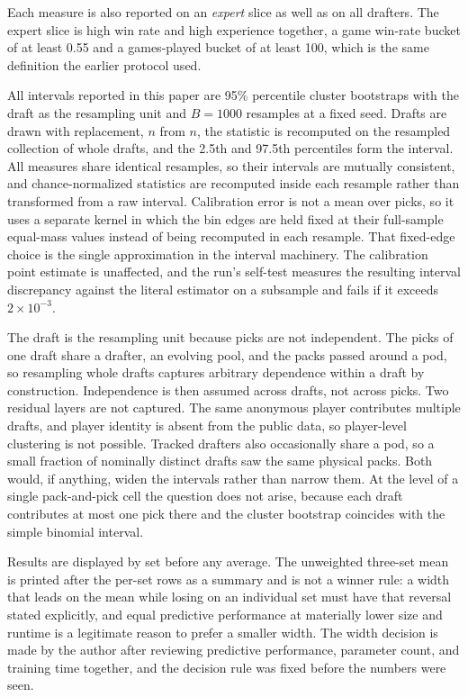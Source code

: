 \documentclass[11pt]{article}
\numberwithin{equation}{section}
\begin{document}
Each measure is also reported on an \emph{expert} slice as well as on all
drafters. The expert slice is high win rate and high experience together, a
game win-rate bucket of at least 0.55 and a games-played bucket of at least 100,
which is the same definition the earlier protocol used.

All intervals reported in this paper are 95\% percentile cluster bootstraps with
the draft as the resampling unit and $B=1000$ resamples at a fixed seed. Drafts
are drawn with replacement, $n$ from $n$, the statistic is recomputed on the
resampled collection of whole drafts, and the 2.5th and 97.5th percentiles form
the interval. All measures share identical resamples, so their intervals are
mutually consistent, and chance-normalized statistics are recomputed inside each
resample rather than transformed from a raw interval. Calibration error is not a
mean over picks, so it uses a separate kernel in which the bin edges are held
fixed at their full-sample equal-mass values instead of being recomputed in each
resample. That fixed-edge choice is the single approximation in the interval
machinery. The calibration point estimate is unaffected, and the run's self-test
measures the resulting interval discrepancy against the literal estimator on a
subsample and fails if it exceeds $2\times10^{-3}$.

The draft is the resampling unit because picks are not independent. The picks of
one draft share a drafter, an evolving pool, and the packs passed around a pod,
so resampling whole drafts captures arbitrary dependence within a draft by
construction. Independence is then assumed across drafts, not across picks. Two
residual layers are not captured. The same anonymous player contributes multiple
drafts, and player identity is absent from the public data, so player-level
clustering is not possible. Tracked drafters also occasionally share a pod, so a
small fraction of nominally distinct drafts saw the same physical packs. Both
would, if anything, widen the intervals rather than narrow them. At the level of
a single pack-and-pick cell the question does not arise, because each draft
contributes at most one pick there and the cluster bootstrap coincides with the
simple binomial interval.

Results are displayed by set before any average. The unweighted three-set mean
is printed after the per-set rows as a summary and is not a winner rule: a width
that leads on the mean while losing on an individual set must have that reversal
stated explicitly, and equal predictive performance at materially lower size and
runtime is a legitimate reason to prefer a smaller width. The width decision is
made by the author after reviewing predictive performance, parameter count, and
training time together, and the decision rule was fixed before the numbers were
seen.
\end{document}
